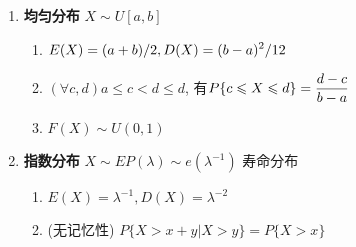 \begin{enumerate}
\item {\bf 均匀分布} $X\sim U[a,b ]$\\
\begin{enumerate}[label={\sf 性质\arabic*}]
\item $\displaystyle E(X)={(a+b)}/{2}, D(X)={(b-a)^2}/{12}$
\item $(\forall c,d) a\le c<d\le d$, 有$P\{c\leqslant X\leqslant d\}=\displaystyle\frac{d-c}{b-a}$
\item $F(X)\sim U(0,1)$
\end{enumerate}

\item {\bf 指数分布} $X\sim EP(\lambda)\sim e(\lambda^{-1})$ 寿命分布\\
\begin{enumerate}[label={\sf 性质\arabic*}]
\item $E(X)=\lambda^{-1}, D(X)=\lambda^{-2}$
\item (无记忆性) $P\{X>x+y|X>y\}=P\{X>x\}$
\end{enumerate}


\end{enumerate}
